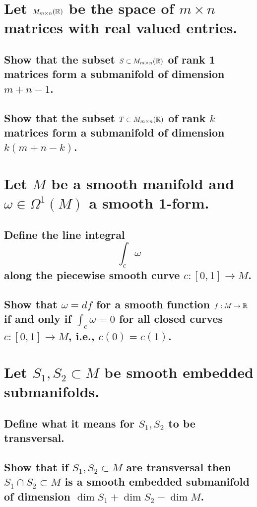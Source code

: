 \documentclass[10pt]{article}
\begin{document}
 

\section{Let $M_{ m \times n}(\mathbb{R}) $ be the space of $m \times n$ matrices with real
  valued entries.}

\subsection{Show that the subset $S \subset M_{m \times n}(\mathbb{R})$ of rank 1 matrices form a
  submanifold of dimension $m+n-1$.}

\subsection{Show that the subset $T \subset M_{m \times n}(\mathbb{R})$ of rank $k$ matrices form a
  submanifold of dimension $k(m+n-k)$.}

\section{Let $M$ be a smooth manifold and $\omega \in \Omega^1(M)$ a smooth 1-form.}

\subsection{Define the line integral
  $$\int_c \omega$$
  along the piecewise smooth curve $c: [0,1] \to M$.}

\subsection{Show that $\omega = df $ for a smooth function $f : M \to \mathbb{R}$ if and only if
  $\int_c \omega =0$ for all closed curves $c: [0,1] \to M$, i.e., $c(0) = c(1)$.}

\section{Let $S_1, S_2 \subset M$ be smooth embedded submanifolds.}

\subsection{Define what it means for $S_1, S_2$ to be transversal.}

\subsection{Show that if $S_1, S_2 \subset M$ are transversal then $S_1 \cap S_2 \subset M$ is a
  smooth embedded submanifold of dimension $\dim S_1 + \dim S_2 - \dim M$.}
\end{document}

